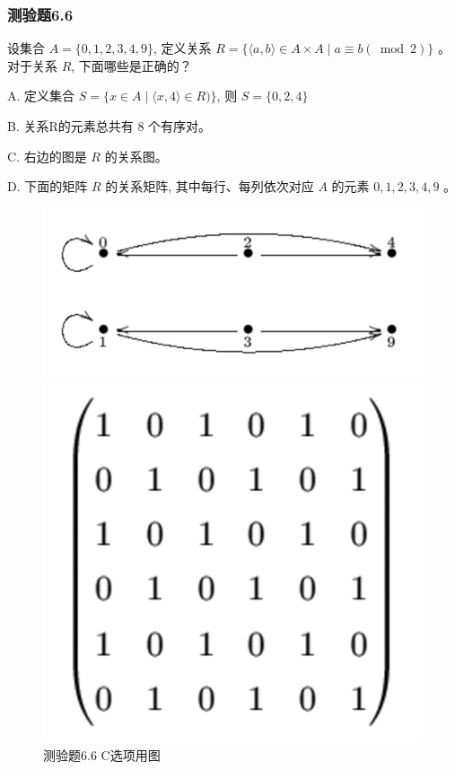 \documentclass[UTF8, heading=true]{ctexart}
\begin{document}
\subsubsection{测验题6.6}

设集合 $A=\{0,1,2,3,4,9\}$, 定义关系 $R=\{\langle a, b\rangle \in A \times A \mid a \equiv b(\bmod 2)\}$ 。对于关系 $R$, 下面哪些是正确的？

A. 定义集合 $S=\{x \in A \mid\langle x, 4\rangle \in R)\}$, 则 $S=\{0,2,4\}$

B. 关系R的元素总共有 8 个有序对。

C. 右边的图是 $R$ 的关系图。

D. 下面的矩阵 $R$ 的关系矩阵, 其中每行、每列依次对应 $A$ 的元素 $0,1,2,3,4,9$ 。


\begin{figure}[htbp]
    \centering
    \begin{minipage}[t]{0.45\textwidth}
        \centering
        \includegraphics[width=1\textwidth]{6.6_1.jpg} %
	      \vspace{-0.3cm}
        \caption{测验题6.6 C选项用图}
    \end{minipage}
    \hfill
    \begin{minipage}[t]{0.23\textwidth}
        \centering
        \includegraphics[width=1\textwidth]{6.6_2.jpg} %

\end{minipage}
\end{figure}
\end{document}
